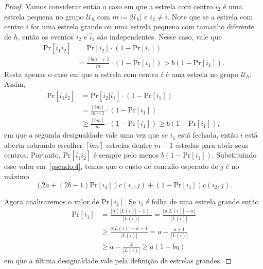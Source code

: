 \begin{proof}
    Vamos considerar então o caso em que a estrela com centro $i_2$ é uma estrela pequena no grupo $\mathcal{U}_h$ com $m \coloneqq |\mathcal{U}_h|$ e $i_2 \neq i$. Note que se a estrela com centro $i$ for uma estrela grande ou uma estrela pequena com tamanho diferente de $h$, então os eventos $i_2$ e $\bar{i}_1$ são independentes. Nesse caso, vale que 
    \begin{align}
        \text{Pr}[\bar{i}_1i_2] &= \text{Pr}[i_2] \cdot (1 - \text{Pr}[i_1]) \nonumber \\
        & = \frac{\left \lceil bm \right \rceil + 1}{m} \cdot (1 - \text{Pr}[i_1]) > b (1 - \text{Pr}[i_1]) \nonumber.
    \end{align}
    Resta apenas o caso em que a estrela com centro $i$ é uma estrela no grupo $\mathcal{U}_h$. Assim,
    \begin{align}
        \text{Pr}[\bar{i}_1i_2] &= \text{Pr}[i_2| \bar{i}_1] \cdot (1 - \text{Pr}[i_1]) \nonumber \\
        & = \frac{\left \lceil bm \right \rceil}{m - 1 } \cdot (1 - \text{Pr}[i_1]) \nonumber \\
        & \geq \frac{\left \lceil bm \right \rceil}{m} \cdot (1 - \text{Pr}[i_1]) \geq b (1 - \text{Pr}[i_1]), \nonumber
    \end{align}
    em que a segunda desigualdade vale uma vez que se $i_1$ está fechada, então $i$ está aberta sobrando escolher $\left \lceil bm \right \rceil$ estrelas dentre $m -1 $ estrelas para abrir seus centros. Portanto, Pr$[\bar{i}_1i_2]$ é sempre pelo menos $b (1 - \text{Pr}[i_1])$. Substituindo esse valor em~\eqref{pseudo:4}, temos que o custo de conexão esperado de $j$ é no máximo
    \begin{equation}
        (2a + (2b -1) \text{Pr}[i_1])c(i_1,j) + (1 - \text{Pr}[i_1])c(i_2,j). \label{pseudo:5}
    \end{equation}

    Agora analisaremos o valor de Pr$[i_1]$. Se $i_1$ é folha de uma estrela grande então
    \begin{align}
        \text{Pr}[i_1] &= \frac{\lfloor a (|L(i)| - 1) \rfloor}{|L(i)|}  = \frac{\lfloor  a|L(i)| - a \rfloor}{|L(i)|}\nonumber \\
        &\geq \frac{a |L(i)| - a - 1}{|L(i)|} = a - \frac{a+1}{|L(i)|} \nonumber \\
        &\geq a - \frac{2}{|L(i)|} \geq a (1 - b\eta)\nonumber
    \end{align}
    em que a última desigualdade vale pela definição de estrelas grandes.


\end{proof}
